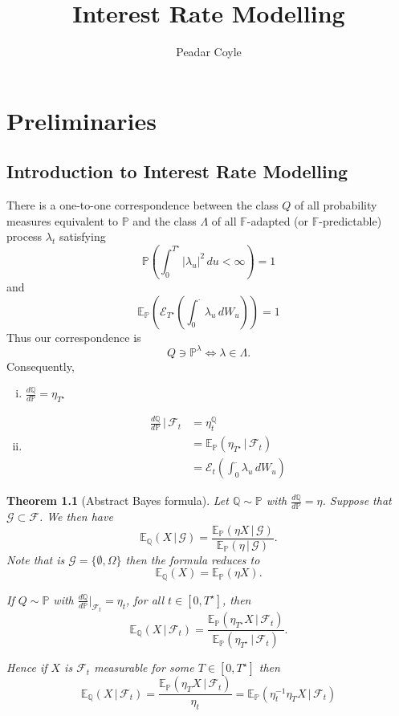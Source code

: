 \documentclass[10pt, oneside, reqno]{amsbook}
\title{Interest Rate Modelling}                              %
\author{Peadar Coyle}
\theoremstyle{plain}%
\newtheorem{thm}{Theorem}[chapter]
\theoremstyle{definition}
\theoremstyle{rem}
\theoremstyle{definition}
\def \P {\ensuremath{\mathcal{P}}}
\newcommand{\given}{ \, | \,}
\newcommand{\sigf}{\mathcal{F}}
\newcommand{\Q}{\mathbb{Q}}
\newcommand{\E}{\mathbb{E}}
\renewcommand{\P}{\mathbb{P}}
\newcommand{\F}{\mathbb{F}}
\newcommand{\sigg}{\mathcal{G}}
\newcommand{\doleans}[1]{\mathcal E_t \left(\int_0^\cdot #1 \right)}
\numberwithin{equation}{chapter}
\begin{document}
\maketitle \tableofcontents \clearpage


\tableofcontents

\chapter{Preliminaries} %
\label{cha:preliminaries}

\section{Introduction to Interest Rate Modelling} %
\label{sec:introduction_to_interest_rate_modelling}

There is a one-to-one correspondence between the class $Q$ of all probability measures equivalent to $\P$ and the class $\Lambda$ of all $\F$-adapted (or $\F$-predictable) process $\lambda_t$ satisfying \[
    \P\left(\int_0^{T^\star} |\lambda_u|^2 \, du < \infty \right) = 1
\]
and \[
    \E_\P\left( \mathcal{E}_{T^\star} \left(\int_0^\cdot \lambda_u \, dW_u\right) \right) = 1
\] 
Thus our correspondence is \[Q \ni \P^\lambda \iff \lambda \in \Lambda.\]
Consequently, \begin{enumerate}[(i)]
    \item $\frac{d\Q}{d\P} = \eta_{T^\star}$
    \item \begin{align*}
        \frac{d\Q}{d\P} \given \sigf_t  &= \eta^\Q_t \\
                                        &= \E_\P\left(\eta_{T^\star} \given \sigf_t \right) \\
                                        &= \doleans{\lambda_u \, dW_u}
    \end{align*}
\end{enumerate}

\begin{thm}[Abstract Bayes formula]
    Let $\Q \sim \P$ with $\frac{d \Q}{d \P} = \eta$.  Suppose that $\sigg \subset \sigf$.  We then have \[
        \E_\Q(X \given \sigg) = \frac{\E_\P(\eta X \given \sigg)}{\E_\P(\eta \given \sigg)}.
    \]  Note that is $\sigg = \{ \emptyset, \Omega \}$ then the formula reduces to \[
        \E_\Q(X) = \E_\P(\eta X).
    \]

    If $Q \sim \P$ with $\frac{d\Q}{d\P} |_{\sigf_t} = \eta_t$, for all $t \in [0, T^\star]$, then \[
        \E_\Q(X \given \sigf_t) = \frac{\E_\P(\eta_{T^\star} X \given \sigf_t)}{\E_\P(\eta_{T^\star} \given \sigf_t)}.
    \]
    
    Hence if $X$ is $\sigf_t$ measurable for some $T \in [0, T^\star]$ then \[
        \E_\Q(X \given \sigf_t) = \frac{\E_\P(\eta_T X \given \sigf_t)}{\eta_t} = \E_\P(\eta_t^{-1} \eta_T X \given \sigf_t)
    \]
\end{thm}
\end{document}
